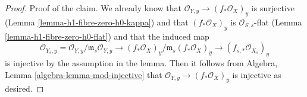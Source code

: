\documentclass[10pt,a4paper]{amsart}
\theoremstyle{plain}
\theoremstyle{definition}
\theoremstyle{remark}
\numberwithin{equation}{subsection}
\begin{document}
\begin{proof}
\medskip\noindent
Proof of the claim. We already know that
$\mathcal{O}_{Y, y} \longrightarrow (f_*\mathcal{O}_X)_y$
is surjective (Lemma \ref{lemma-h1-fibre-zero-h0-kappa})
and that $(f_*\mathcal{O}_X)_y$ is
$\mathcal{O}_{S, s}$-flat (Lemma \ref{lemma-h1-fibre-zero-h0-flat})
and that the induced map
$$
\mathcal{O}_{Y_s, y} =  \mathcal{O}_{Y, y}/\mathfrak m_s\mathcal{O}_{Y, y}
\longrightarrow
(f_*\mathcal{O}_X)_y/\mathfrak m_s (f_*\mathcal{O}_X)_y
\to
(f_{s, *}\mathcal{O}_{X_s})_y
$$
is injective by the assumption in the lemma. Then it follows from
Algebra, Lemma \ref{algebra-lemma-mod-injective}
that $\mathcal{O}_{Y, y} \longrightarrow (f_*\mathcal{O}_X)_y$
is injective as desired.
\end{proof}
\end{document}
